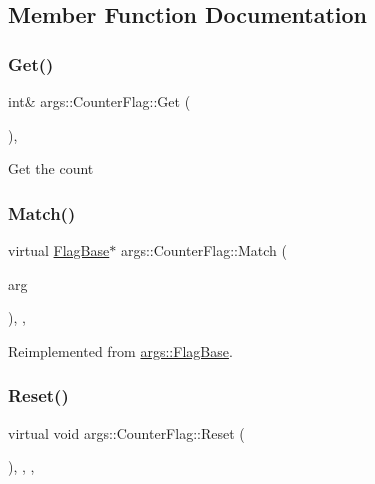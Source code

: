 \subsection{Member Function Documentation}
\mbox{\label{classargs_1_1_counter_flag_a74569d67e5fddf37d08614abb0df525c}} 
\subsubsection{\texorpdfstring{Get()}{Get()}}
{\footnotesize\ttfamily int\& args\+::\+Counter\+Flag\+::\+Get (\begin{DoxyParamCaption}{ }\end{DoxyParamCaption})\hspace{0.3cm}{\ttfamily [inline]}, {\ttfamily [noexcept]}}

Get the count \mbox{\label{classargs_1_1_counter_flag_ade999a8d89a8fd3db7508dfe7fdf851c}} 
\subsubsection{\texorpdfstring{Match()}{Match()}}
{\footnotesize\ttfamily virtual \hyperlink{classargs_1_1_flag_base}{Flag\+Base}$\ast$ args\+::\+Counter\+Flag\+::\+Match (\begin{DoxyParamCaption}\item[{const \hyperlink{structargs_1_1_either_flag}{Either\+Flag} \&}]{arg }\end{DoxyParamCaption})\hspace{0.3cm}{\ttfamily [inline]}, {\ttfamily [override]}, {\ttfamily [virtual]}}



Reimplemented from \hyperlink{classargs_1_1_flag_base_a729ebb681d373f09875abb2e04f820f2}{args\+::\+Flag\+Base}.

\mbox{\label{classargs_1_1_counter_flag_a408f9c2bf8f3715b89f27f23dfa2a3a5}} 
\subsubsection{\texorpdfstring{Reset()}{Reset()}}
{\footnotesize\ttfamily virtual void args\+::\+Counter\+Flag\+::\+Reset (\begin{DoxyParamCaption}{ }\end{DoxyParamCaption})\hspace{0.3cm}{\ttfamily [inline]}, {\ttfamily [override]}, {\ttfamily [virtual]}, {\ttfamily [noexcept]}}



